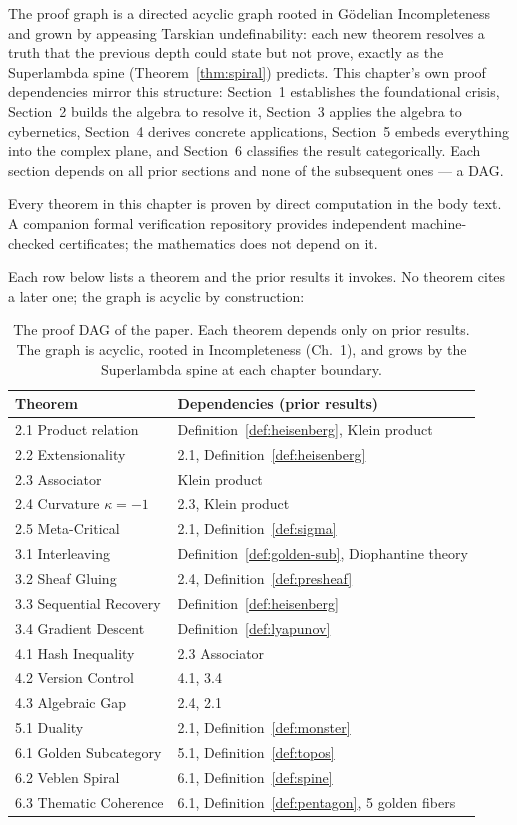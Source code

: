 \documentclass[12pt,oneside]{article}
\theoremstyle{principia}
\theoremstyle{definition}
\theoremstyle{remark}
\providecommand{\kap}{\kappa}
\begin{document}
The proof graph is a directed acyclic graph rooted in G\"odelian Incompleteness and grown by appeasing Tarskian undefinability: each new theorem resolves a truth that the previous depth could state but not prove, exactly as the Superlambda spine (Theorem~\ref{thm:spiral}) predicts. This chapter's own proof dependencies mirror this structure: Section~1 establishes the foundational crisis, Section~2 builds the algebra to resolve it, Section~3 applies the algebra to cybernetics, Section~4 derives concrete applications, Section~5 embeds everything into the complex plane, and Section~6 classifies the result categorically. Each section depends on all prior sections and none of the subsequent ones --- a DAG.

Every theorem in this chapter is proven by direct computation in the body text. A companion formal verification repository provides independent machine-checked certificates; the mathematics does not depend on it.

Each row below lists a theorem and the prior results it invokes. No theorem cites a later one; the graph is acyclic by construction:

\begin{table}[!ht]
\centering\small
\begin{tabular}{@{}lp{8cm}@{}}
\toprule
\textbf{Theorem} & \textbf{Dependencies (prior results)} \\
\midrule
2.1 Product relation & Definition~\ref{def:heisenberg}, Klein product \\
2.2 Extensionality & 2.1, Definition~\ref{def:heisenberg} \\
2.3 Associator & Klein product \\
2.4 Curvature $\kap = -1$ & 2.3, Klein product \\
2.5 Meta-Critical & 2.1, Definition~\ref{def:sigma} \\
3.1 Interleaving & Definition~\ref{def:golden-sub}, Diophantine theory \\
3.2 Sheaf Gluing & 2.4, Definition~\ref{def:presheaf} \\
3.3 Sequential Recovery & Definition~\ref{def:heisenberg} \\
3.4 Gradient Descent & Definition~\ref{def:lyapunov} \\
4.1 Hash Inequality & 2.3 Associator \\
4.2 Version Control & 4.1, 3.4 \\
4.3 Algebraic Gap & 2.4, 2.1 \\
5.1 Duality & 2.1, Definition~\ref{def:monster} \\
6.1 Golden Subcategory & 5.1, Definition~\ref{def:topos} \\
6.2 Veblen Spiral & 6.1, Definition~\ref{def:spine} \\
6.3 Thematic Coherence & 6.1, Definition~\ref{def:pentagon}, 5 golden fibers \\
\bottomrule
\end{tabular}
\caption{The proof DAG of the paper. Each theorem depends only on prior results. The graph is acyclic, rooted in Incompleteness (Ch.~1), and grows by the Superlambda spine at each chapter boundary.}
\end{table}
\end{document}
